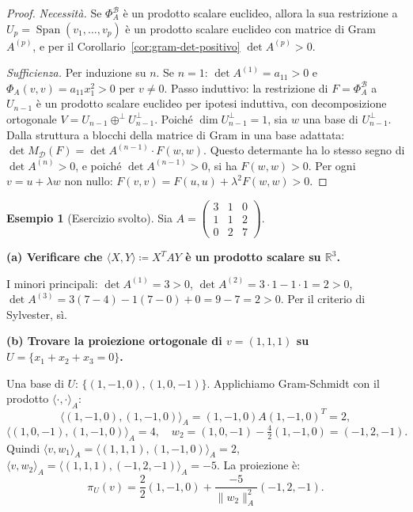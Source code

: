 \documentclass[11pt, a4paper]{book}
\theoremstyle{definition}
\newtheorem{esempio}[definizione]{Esempio}
\theoremstyle{plain}
\theoremstyle{remark}
\newcommand{\R}{\mathbb{R}}
\DeclareMathOperator{\Span}{Span}
\begin{document}
\begin{proof}
\emph{Necessità.} Se $\Phi^{\mathcal{B}}_A$ è un prodotto scalare euclideo, allora la sua restrizione a $U_p = \Span(v_1,\ldots,v_p)$ è un prodotto scalare euclideo con matrice di Gram $A^{(p)}$, e per il Corollario~\ref{cor:gram-det-positivo} $\det A^{(p)} > 0$.

\emph{Sufficienza.} Per induzione su $n$. Se $n=1$: $\det A^{(1)} = a_{11} > 0$ e $\Phi_A(v,v) = a_{11}x_1^2 > 0$ per $v \neq 0$. Passo induttivo: la restrizione di $F = \Phi^{\mathcal{B}}_A$ a $U_{n-1}$ è un prodotto scalare euclideo per ipotesi induttiva, con decomposizione ortogonale $V = U_{n-1} \oplus^\perp U_{n-1}^\perp$. Poiché $\dim U_{n-1}^\perp = 1$, sia $w$ una base di $U_{n-1}^\perp$. Dalla struttura a blocchi della matrice di Gram in una base adattata: $\det M_{\mathcal{D}}(F) = \det A^{(n-1)} \cdot F(w,w)$. Questo determante ha lo stesso segno di $\det A^{(n)} > 0$, e poiché $\det A^{(n-1)} > 0$, si ha $F(w,w) > 0$. Per ogni $v = u + \lambda w$ non nullo: $F(v,v) = F(u,u) + \lambda^2 F(w,w) > 0$.
\end{proof}

\begin{exbox}
\begin{esempio}[Esercizio svolto]
\label{es:sylvester}
Sia $A = \begin{pmatrix}3&1&0\\1&1&2\\0&2&7\end{pmatrix}$.

\textbf{(a) Verificare che $\langle X,Y\rangle \coloneqq X^T A Y$ è un prodotto scalare su $\R^3$.}

I minori principali: $\det A^{(1)} = 3 > 0$, $\det A^{(2)} = 3\cdot1-1\cdot1 = 2 > 0$, $\det A^{(3)} = 3(7-4)-1(7-0)+0 = 9-7 = 2 > 0$. Per il criterio di Sylvester, sì.

\textbf{(b) Trovare la proiezione ortogonale di $v=(1,1,1)$ su $U = \{x_1+x_2+x_3=0\}$.}

Una base di $U$: $\{(1,-1,0),(1,0,-1)\}$. Applichiamo Gram-Schmidt con il prodotto $\langle\cdot,\cdot\rangle_A$:
\[
  \langle(1,-1,0),(1,-1,0)\rangle_A = (1,-1,0)A(1,-1,0)^T = 2,
\]
\[
  \langle(1,0,-1),(1,-1,0)\rangle_A = 4, \quad w_2 = (1,0,-1) - \tfrac{4}{2}(1,-1,0) = (-1,2,-1).
\]
Quindi $\langle v,w_1\rangle_A = \langle(1,1,1),(1,-1,0)\rangle_A = 2$, $\langle v,w_2\rangle_A = \langle(1,1,1),(-1,2,-1)\rangle_A = -5$. La proiezione è:
\[
  \pi_U(v) = \frac{2}{2}(1,-1,0) + \frac{-5}{\|w_2\|^2_A}(-1,2,-1).
\]
\end{esempio}
\end{exbox}
\end{document}
